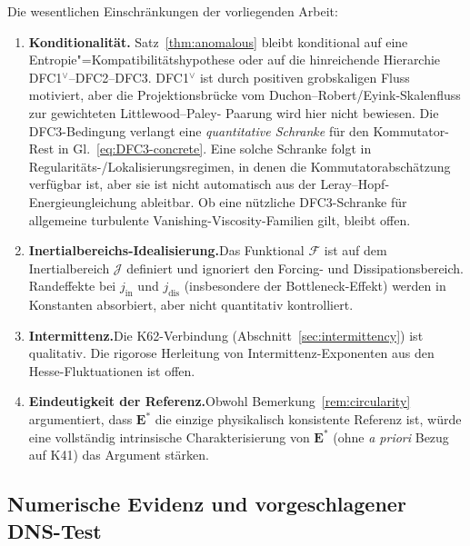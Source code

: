 \documentclass[12pt,a4paper]{article}
\theoremstyle{breakdef}
\theoremstyle{breakplain}
\theoremstyle{breakdef}
\begin{document}
Die wesentlichen Einschränkungen der vorliegenden Arbeit:
\begin{enumerate}
\item \textbf{Konditionalität.}\quad
  Satz~\ref{thm:anomalous} bleibt
  konditional auf eine Entropie"=Kompatibilitäts\-hypothese oder auf die
  hinreichende Hierarchie DFC1$^\vee$\allowbreak--\allowbreak DFC2\allowbreak--\allowbreak DFC3. DFC1$^\vee$ ist durch
  positiven grobskaligen Fluss motiviert, aber die Projektionsbrücke vom
  Duchon--Robert/Eyink-Skalenfluss zur gewichteten Littlewood--Paley-
  Paarung wird hier nicht bewiesen.
  Die DFC3-Bedingung verlangt eine \emph{quantitative Schranke} für den
  Kommutator-Rest in Gl.~\eqref{eq:DFC3-concrete}. Eine solche Schranke
  folgt in Regularitäts-/Lokalisierungsregimen, in denen die
  Kommutatorabschätzung verfügbar ist, aber sie ist nicht automatisch aus
  der Leray--Hopf-Energieungleichung ableitbar. Ob eine nützliche
  DFC3-Schranke für allgemeine turbulente Vanishing-Viscosity-Familien
  gilt, bleibt offen.
\item \textbf{Inertialbereichs-Idealisierung.}\quad Das Funktional $\mathcal{F}$
  ist auf dem Inertialbereich $\mathcal{J}$ definiert und ignoriert den
  Forcing- und Dissipationsbereich. Randeffekte bei $j_{\mathrm{in}}$ und
  $j_{\mathrm{dis}}$ (insbesondere der Bottleneck-Effekt) werden in
  Konstanten absorbiert, aber nicht quantitativ kontrolliert.
\item \textbf{Intermittenz.}\quad Die K62-Verbindung
  (Abschnitt~\ref{sec:intermittency}) ist qualitativ. Die rigorose
  Herleitung von Intermittenz-Exponenten aus den Hesse-Fluktuationen ist
  offen.
\item \textbf{Eindeutigkeit der Referenz.}\quad Obwohl
  Bemerkung~\ref{rem:circularity} argumentiert, dass $\mathbf{E}^*$ die
  einzige physikalisch konsistente Referenz ist, würde eine vollständig
  intrinsische Charakterisierung von $\mathbf{E}^*$ (ohne \emph{a priori}
  Bezug auf K41) das Argument stärken.
\end{enumerate}

\subsection{Numerische Evidenz und vorgeschlagener DNS-Test}
\end{document}
